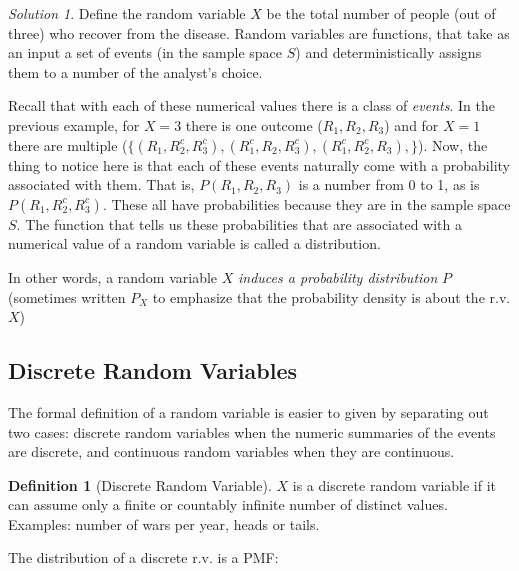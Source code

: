 \documentclass[
]{book}
\theoremstyle{definition}
\newtheorem{definition}{Definition}[chapter]
\theoremstyle{definition}
\theoremstyle{definition}
\theoremstyle{remark}
\newtheorem*{solution}{Solution}
\begin{document}
\begin{solution}
{}Define the random variable \(X\) be the total number of people (out of three) who recover from the disease. Random variables are functions, that take as an input a set of events (in the sample space \(S\)) and deterministically assigns them to a number of the analyst's choice.
\end{solution}

Recall that with each of these numerical values there is a class of \emph{events}. In the previous example, for \(X = 3\) there is one outcome (\(R_1, R_2, R_3\)) and for \(X = 1\) there are multiple (\(\{(R_1, R_2^c, R_3^c), (R_1^c, R_2, R_3^c), (R_1^c, R_2^c, R_3), \}\)). Now, the thing to notice here is that each of these events naturally come with a probability associated with them. That is, \(P(R_1, R_2, R_3)\) is a number from 0 to 1, as is \(P(R_1, R_2^c, R_3^c)\). These all have probabilities because they are in the sample space \(S\). The function that tells us these probabilities that are associated with a numerical value of a random variable is called a distribution.

In other words, a random variable \(X\) \emph{induces a probability distribution} \(P\) (sometimes written \(P_X\) to emphasize that the probability density is about the r.v. \(X\))

\hypertarget{discrete-random-variables}{%
\subsection*{Discrete Random Variables}\label{discrete-random-variables}}

The formal definition of a random variable is easier to given by separating out two cases: discrete random variables when the numeric summaries of the events are discrete, and continuous random variables when they are continuous.

\begin{definition}[Discrete Random Variable]
\protect\hypertarget{def:unnamed-chunk-75}{}{\label{def:unnamed-chunk-75} {} }\(X\) is a discrete random variable if it can assume only a finite or countably infinite number of distinct values. Examples: number of wars per year, heads or tails.
\end{definition}

The distribution of a discrete r.v. is a PMF:
\end{document}
